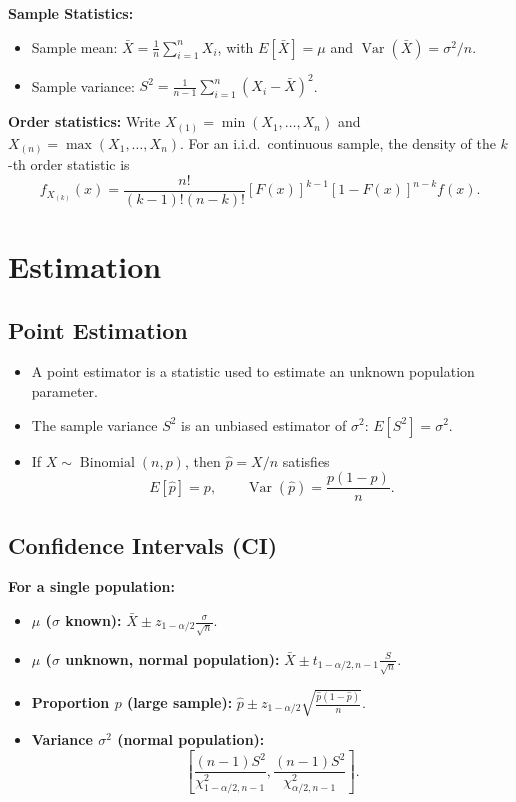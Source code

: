 \documentclass[12pt,a4paper]{article}
\begin{document}
\begin{thmbox}[title=Sample Distributions and Order Statistics]
\textbf{Sample Statistics:} 
\begin{itemize}
    \item Sample mean:
    $\bar{X}=\frac{1}{n}\sum_{i=1}^nX_i$, with
    $E[\bar{X}]=\mu$ and $\operatorname{Var}(\bar{X})=\sigma^2/n$.
    \item Sample variance:
    $S^2=\frac{1}{n-1}\sum_{i=1}^n(X_i-\bar{X})^2$.
\end{itemize}
\textbf{Order statistics:} Write
$X_{(1)}=\min(X_1,\ldots,X_n)$ and
$X_{(n)}=\max(X_1,\ldots,X_n)$. For an i.i.d.\ continuous sample, the density
of the $k$-th order statistic is
\[
    f_{X_{(k)}}(x)
    =\frac{n!}{(k-1)!(n-k)!}
    [F(x)]^{k-1}[1-F(x)]^{n-k}f(x).
\]
\end{thmbox}


\section{Estimation}

\subsection{Point Estimation}
\begin{itemize}
    \item A point estimator is a statistic used to estimate an unknown
    population parameter.
    \item The sample variance $S^2$ is an unbiased estimator of $\sigma^2$:
    $E[S^2]=\sigma^2$.
    \item If $X\sim\operatorname{Binomial}(n,p)$, then
    $\hat{p}=X/n$ satisfies
    \[
        E[\hat{p}]=p,
        \qquad
        \operatorname{Var}(\hat{p})=\frac{p(1-p)}{n}.
    \]
\end{itemize}

\subsection{Confidence Intervals (CI)}
\begin{defbox}[title={$100(1-\alpha)\%$ Confidence Intervals}]
\textbf{For a single population:}
\begin{itemize}
    \item \textbf{$\mu$ ($\sigma$ known):}
    $\bar{X}\pm z_{1-\alpha/2}\frac{\sigma}{\sqrt{n}}$.
    \item \textbf{$\mu$ ($\sigma$ unknown, normal population):}
    $\bar{X}\pm t_{1-\alpha/2,n-1}\frac{S}{\sqrt{n}}$.
    \item \textbf{Proportion $p$ (large sample):}
    $\hat{p}\pm z_{1-\alpha/2}
    \sqrt{\frac{\hat{p}(1-\hat{p})}{n}}$.
    \item \textbf{Variance $\sigma^2$ (normal population):}
    \[
        \left[
            \frac{(n-1)S^2}{\chi^2_{1-\alpha/2,n-1}},
            \frac{(n-1)S^2}{\chi^2_{\alpha/2,n-1}}
        \right].
    \]
\end{itemize}
\end{defbox}
\end{document}
